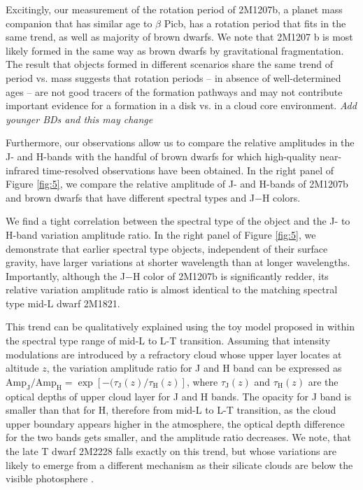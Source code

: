\documentclass[apj]{emulateapj}
\newcommand{\bpic}{$\beta$ Pic}
\begin{document}
Excitingly, our measurement of the rotation period of 2M1207b, a
planet mass companion that has similar age to \bpic b, has a rotation
period that fits in the same trend, as well as majority of brown
dwarfs.  We note that 2M1207 b is most likely formed in the same way as
brown dwarfs by gravitational fragmentation. The result that objects
formed in different scenarios share the same trend of period vs. mass suggests that
rotation periods -- in absence of well-determined ages -- are not good tracers of the formation pathways and
may not contribute important evidence for a formation in a disk vs. in
a cloud core environment.
{\em Add younger BDs and this may change}

Furthermore, our observations allow us to compare the relative
amplitudes in the J- and H-bands with the handful of brown dwarfs
for which high-quality near-infrared time-resolved observations have
been obtained. In the right panel of Figure \ref{fig:5}, we compare the
relative amplitude of J- and H-bands of 2M1207b and brown dwarfs
\citep{Apai2013,Buenzli2012,Buenzli2015,Burgasser2013,Radigan2012,Yang2014} that
have different spectral types and J$-$H colors.

We find a tight correlation between the spectral type of the object
and the J- to H-band variation amplitude ratio. In the right panel of
Figure \ref{fig:5}, we demonstrate that earlier spectral type
objects, independent of their surface gravity, have larger variations
at shorter wavelength than at longer wavelengths. Importantly,
although the J$-$H color of 2M1207b is significantly redder, its
relative variation amplitude ratio is almost identical to the matching
spectral type mid-L dwarf 2M1821.

This trend can be qualitatively explained using the toy model proposed
in \cite{Yang2014} within the spectral type range of mid-L to L-T
transition. Assuming that intensity modulations are introduced by a
refractory cloud whose upper layer locates at altitude $z$, the
variation amplitude ratio for J and H band can be expressed as
$\mathrm{Amp_{J}}/\mathrm{Amp_{H}} =
\exp\left[-(\tau_{\mathrm{J}}(z)/\tau_{{\mathrm{H}}}(z)\right]$,
where $\tau_{\mathrm{J}}(z)$ and $\tau_{\mathrm{H}}(z)$ are the
optical depths of upper cloud layer for J and H bands. The opacity for
J band is smaller than that for H, therefore from mid-L to L-T
transition, as the cloud upper boundary appears higher in the
atmosphere, the optical depth difference for the two bands gets
smaller, and the amplitude ratio decreases.  We note, that the late T
dwarf 2M2228 falls exactly on this trend, but whose variations are
likely to emerge from a different mechanism as their silicate clouds
are below the visible photosphere \citep[e.g.][]{Stephens2009}.
\end{document}
